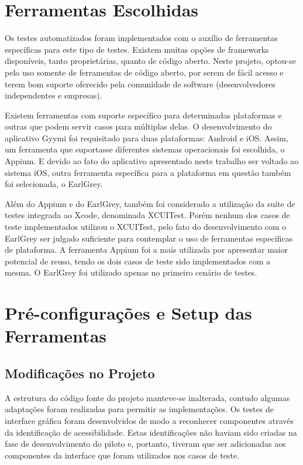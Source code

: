 \section{Ferramentas Escolhidas}
Os testes automatizados foram implementados com o auxílio de ferramentas específicas para este tipo de testes. Existem muitas opções de frameworks disponíveis, tanto proprietárias, quanto de código aberto. Neste projeto, optou-se pelo uso somente de ferramentas de código aberto, por serem de fácil acesso e terem bom suporte oferecido pela comunidade de software (desenvolvedores independentes e empresas).

Existem ferramentas com suporte específico para determinadas plataformas e outras que podem servir casos para múltiplas delas. O desenvolvimento do aplicativo Gyymi foi requisitado para duas plataformas: Android e iOS. Assim, um ferramenta que suportasse diferentes sistemas operacionais foi escolhida, o Appium. E devido ao fato do aplicativo apresentado neste trabalho ser voltado ao sistema iOS, outra ferramenta específica para a plataforma em questão também foi selecionada, o EarlGrey.

Além do Appium e do EarlGrey, também foi considerado a utilização da suíte de testes integrada ao Xcode, denominada XCUITest. Porém nenhum dos casos de teste implementados utilizou o XCUITest, pelo fato do desenvolvimento com o EarlGrey ser julgado suficiente para contemplar o uso de ferramentas específicas de plataforma. A ferramenta Appium foi a mais utilizada por apresentar maior potencial de reuso, tendo os dois casos de teste sido implementados com a mesma. O EarlGrey foi utilizado apenas no primeiro cenário de testes.

\section{Pré-configurações e Setup das Ferramentas}

\subsection{Modificações no Projeto}
A estrutura do código fonte do projeto manteve-se inalterada, contudo algumas adaptações foram realizadas para permitir as implementações. Os testes de interface gráfica foram desenvolvidos de modo a reconhecer componentes através da identificação de acessibilidade. Estas identificações não haviam sido criadas na fase de desenvolvimento do piloto e, portanto, tiveram que ser adicionadas aos componentes da interface que foram utilizados nos casos de teste.

